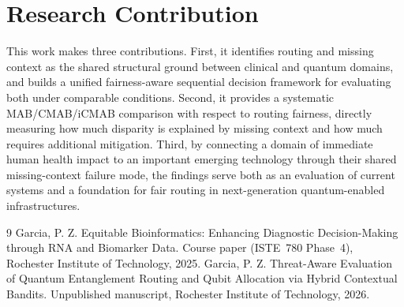\documentclass{IEEEtran}
\begin{document}
\section{Research Contribution}

This work makes three contributions. First, it identifies routing and missing
context as the shared structural ground between clinical and quantum domains,
and builds a unified fairness-aware sequential decision framework for
evaluating both under comparable conditions. Second, it provides a systematic
MAB/CMAB/iCMAB comparison with respect to routing fairness, directly
measuring how much disparity is explained by missing context and how much
requires additional mitigation. Third, by connecting a domain of immediate
human health impact to an important emerging technology through their shared
missing-context failure mode, the findings serve both as an evaluation of
current systems and a foundation for fair routing in next-generation
quantum-enabled infrastructures.


\begin{thebibliography}{9}\setlength{\itemsep}{0em}
Garcia, P. Z. Equitable Bioinformatics: Enhancing Diagnostic
Decision-Making through {RNA} and Biomarker Data. Course paper
(ISTE~780 Phase~4), Rochester Institute of Technology, 2025.
Garcia, P. Z. Threat-Aware Evaluation of Quantum Entanglement Routing
and Qubit Allocation via Hybrid Contextual Bandits. Unpublished
manuscript, Rochester Institute of Technology, 2026.
\end{thebibliography}
\end{document}
